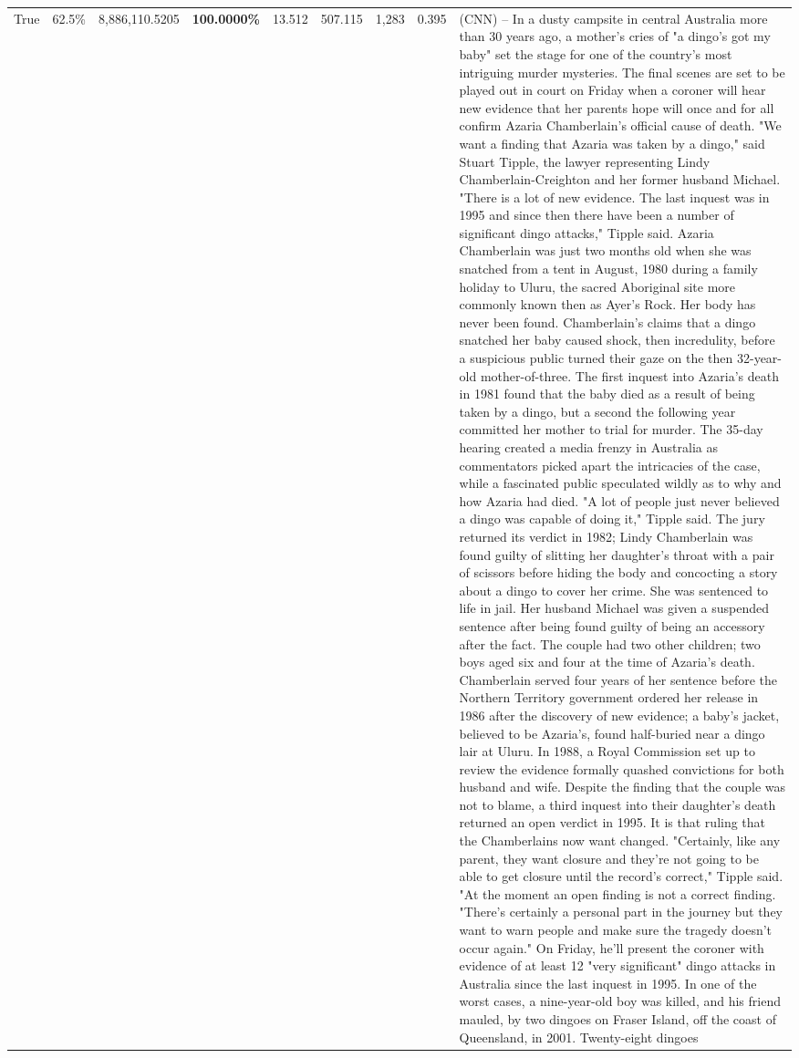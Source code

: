 \begin{table}[H]
\begin{tabular}{lllrlllll}
True & 62.5\% & 8,886,110.5205 & \bfseries \color{red} 100.0000\% & 13.512 & 507.115 & 1,283 & 0.395 & (CNN) -- In a dusty campsite in central Australia more than 30 years ago, a mother's cries of "a dingo's got my baby" set the stage for one of the country's most intriguing murder mysteries. The final scenes are set to be played out in court on Friday when a coroner will hear new evidence that her parents hope will once and for all confirm Azaria Chamberlain's official cause of death. "We want a finding that Azaria was taken by a dingo," said Stuart Tipple, the lawyer representing Lindy Chamberlain-Creighton and her former husband Michael. "There is a lot of new evidence. The last inquest was in 1995 and since then there have been a number of significant dingo attacks," Tipple said. Azaria Chamberlain was just two months old when she was snatched from a tent in August, 1980 during a family holiday to Uluru, the sacred Aboriginal site more commonly known then as Ayer's Rock. Her body has never been found. Chamberlain's claims that a dingo snatched her baby caused shock, then incredulity, before a suspicious public turned their gaze on the then 32-year-old mother-of-three. The first inquest into Azaria's death in 1981 found that the baby died as a result of being taken by a dingo, but a second the following year committed her mother to trial for murder. The 35-day hearing created a media frenzy in Australia as commentators picked apart the intricacies of the case, while a fascinated public speculated wildly as to why and how Azaria had died. "A lot of people just never believed a dingo was capable of doing it," Tipple said. The jury returned its verdict in 1982; Lindy Chamberlain was found guilty of slitting her daughter's throat with a pair of scissors before hiding the body and concocting a story about a dingo to cover her crime. She was sentenced to life in jail. Her husband Michael was given a suspended sentence after being found guilty of being an accessory after the fact. The couple had two other children; two boys aged six and four at the time of Azaria's death. Chamberlain served four years of her sentence before the Northern Territory government ordered her release in 1986 after the discovery of new evidence; a baby's jacket, believed to be Azaria's, found half-buried near a dingo lair at Uluru. In 1988, a Royal Commission set up to review the evidence formally quashed convictions for both husband and wife. Despite the finding that the couple was not to blame, a third inquest into their daughter's death returned an open verdict in 1995. It is that ruling that the Chamberlains now want changed. "Certainly, like any parent, they want closure and they're not going to be able to get closure until the record's correct," Tipple said. "At the moment an open finding is not a correct finding. "There's certainly a personal part in the journey but they want to warn people and make sure the tragedy doesn't occur again." On Friday, he'll present the coroner with evidence of at least 12 "very significant" dingo attacks in Australia since the last inquest in 1995. In one of the worst cases, a nine-year-old boy was killed, and his friend mauled, by two dingoes on Fraser Island, off the coast of Queensland, in 2001. Twenty-eight dingoes 
\end{tabular}
\end{table}

